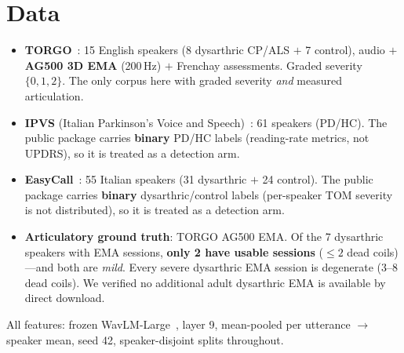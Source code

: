 \documentclass[10pt,twocolumn]{article}
\begin{document}
\section{Data}
\begin{itemize}\itemsep2pt
\item \textbf{TORGO}~\cite{rudzicz2012torgo}: 15 English speakers (8 dysarthric
CP/ALS $+$ 7 control), audio $+$ \textbf{AG500 3D EMA} (200\,Hz) $+$ Frenchay
assessments. Graded severity $\{0,1,2\}$. The only corpus here with graded
severity \emph{and} measured articulation.
\item \textbf{IPVS} (Italian Parkinson's Voice and Speech)~\cite{dimauro2017ipvs}:
61 speakers (PD/HC). The public package carries \textbf{binary} PD/HC labels
(reading-rate metrics, not UPDRS), so it is treated as a detection arm.
\item \textbf{EasyCall}~\cite{turrisi2021easycall}: 55 Italian speakers (31
dysarthric $+$ 24 control). The public package carries \textbf{binary}
dysarthric/control labels (per-speaker TOM severity is not distributed), so it
is treated as a detection arm.
\item \textbf{Articulatory ground truth}: TORGO AG500 EMA. Of the 7 dysarthric
speakers with EMA sessions, \textbf{only 2 have usable sessions} ($\le 2$ dead
coils)---and both are \emph{mild}. Every severe dysarthric EMA session is
degenerate (3--8 dead coils). We verified no additional adult dysarthric EMA is
available by direct download.
\end{itemize}

\noindent All features: frozen WavLM-Large~\cite{chen2022wavlm}, layer 9,
mean-pooled per utterance $\to$ speaker mean, seed 42, speaker-disjoint splits
throughout.

\end{document}
